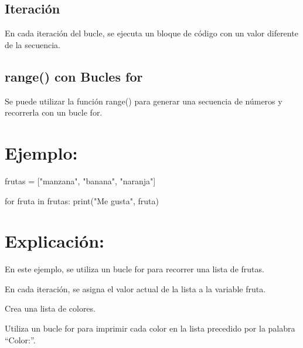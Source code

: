 \documentclass[
  a4paper,
  onepage,
  openany]{scrreprt}
\newenvironment{Shaded}{\begin{snugshade}}{\end{snugshade}}
\newcommand{\BuiltInTok}[1]{\textcolor[rgb]{0.00,0.23,0.31}{#1}}
\newcommand{\ControlFlowTok}[1]{\textcolor[rgb]{0.00,0.23,0.31}{#1}}
\newcommand{\KeywordTok}[1]{\textcolor[rgb]{0.00,0.23,0.31}{#1}}
\newcommand{\NormalTok}[1]{\textcolor[rgb]{0.00,0.23,0.31}{#1}}
\newcommand{\OperatorTok}[1]{\textcolor[rgb]{0.37,0.37,0.37}{#1}}
\newcommand{\StringTok}[1]{\textcolor[rgb]{0.13,0.47,0.30}{#1}}
\begin{document}
\hypertarget{iteraciuxf3n-1}{%
\subsection{Iteración}\label{iteraciuxf3n-1}}

En cada iteración del bucle, se ejecuta un bloque de código con un valor
diferente de la secuencia.

\hypertarget{range-con-bucles-for-1}{%
\subsection{range() con Bucles for}\label{range-con-bucles-for-1}}

Se puede utilizar la función range() para generar una secuencia de
números y recorrerla con un bucle for.

\hypertarget{ejemplo-43}{%
\section{Ejemplo:}\label{ejemplo-43}}

\begin{Shaded}
\begin{Highlighting}[]
\NormalTok{frutas }\OperatorTok{=}\NormalTok{ [}\StringTok{"manzana"}\NormalTok{, }\StringTok{"banana"}\NormalTok{, }\StringTok{"naranja"}\NormalTok{]}

\ControlFlowTok{for}\NormalTok{ fruta }\KeywordTok{in}\NormalTok{ frutas:}
    \BuiltInTok{print}\NormalTok{(}\StringTok{"Me gusta"}\NormalTok{, fruta)}
\end{Highlighting}
\end{Shaded}

\hypertarget{explicaciuxf3n-43}{%
\section{Explicación:}\label{explicaciuxf3n-43}}

En este ejemplo, se utiliza un bucle for para recorrer una lista de
frutas.

En cada iteración, se asigna el valor actual de la lista a la variable
fruta.

\begin{tcolorbox}[enhanced jigsaw, breakable, opacityback=0, toptitle=1mm, coltitle=black, toprule=.15mm, rightrule=.15mm, colframe=quarto-callout-important-color-frame, opacitybacktitle=0.6, arc=.35mm, title=\textcolor{quarto-callout-important-color}{\faExclamation}\hspace{0.5em}{Actividad Práctica:}, titlerule=0mm, colbacktitle=quarto-callout-important-color!10!white, bottomtitle=1mm, bottomrule=.15mm, colback=white, left=2mm, leftrule=.75mm]

Crea una lista de colores.

Utiliza un bucle for para imprimir cada color en la lista precedido por
la palabra ``Color:''.

\end{tcolorbox}
\end{document}
